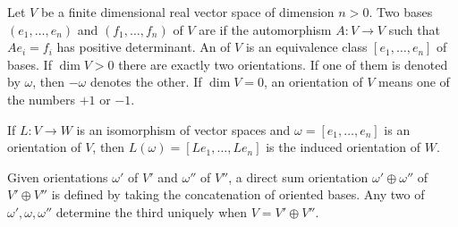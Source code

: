 Let $V$ be a finite dimensional real vector space of dimension $n > 0$. Two bases $(e_1, \ldots, e_n)$ and $(f_1, \ldots, f_n)$ of $V$ are  if the automorphism $A: V \to V$ such that $A e_i = f_i$ has positive determinant. An  of $V$ is an equivalence class $[e_1, \ldots, e_n]$ of bases. If $\dim V > 0$ there are exactly two orientations. If one of them is denoted by $\omega$, then $-\omega$ denotes the other. If $\dim V = 0$, an orientation of $V$ means one of the numbers $+1$ or $-1$.

If $L: V \to W$ is an isomorphism of vector spaces and $\omega = [e_1, \ldots, e_n]$ is an orientation of $V$, then $L(\omega) = [L e_1, \ldots, L e_n]$ is the induced orientation of $W$.

Given orientations $\omega'$ of $V'$ and $\omega''$ of $V''$, a direct sum orientation $\omega' \oplus \omega''$ of $V' \oplus V''$ is defined by taking the concatenation of oriented bases. Any two of $\omega', \omega, \omega''$ determine the third uniquely when $V = V' \oplus V''$.
